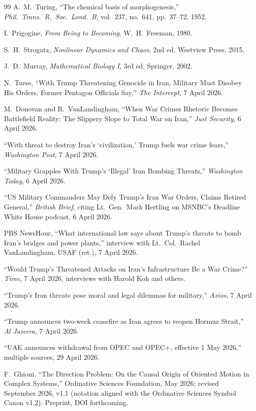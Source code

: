 \documentclass[12pt,a4paper]{article}
\begin{document}
\begin{thebibliography}{99}
A.~M.~Turing, ``The chemical basis of morphogenesis,'' \textit{Phil.~Trans.~R.~Soc.~Lond.~B}, vol.~237, no.~641, pp.~37--72, 1952.

I.~Prigogine, \textit{From Being to Becoming}. W.~H.~Freeman, 1980.

S.~H.~Strogatz, \textit{Nonlinear Dynamics and Chaos}, 2nd ed. Westview Press, 2015.

J.~D.~Murray, \textit{Mathematical Biology I}, 3rd ed. Springer, 2002.

N.~Turse, ``With Trump Threatening Genocide in Iran, Military Must Disobey His Orders, Former Pentagon Officials Say,'' \textit{The Intercept}, 7 April 2026.

M.~Donovan and R.~VanLandingham, ``When War Crimes Rhetoric Becomes Battlefield Reality: The Slippery Slope to Total War on Iran,'' \textit{Just Security}, 6 April 2026.

``With threat to destroy Iran's `civilization,' Trump fuels war crime fears,'' \textit{Washington Post}, 7 April 2026.

``Military Grapples With Trump's `Illegal' Iran Bombing Threats,'' \textit{Washington Today}, 6 April 2026.

``US Military Commanders May Defy Trump's Iran War Orders, Claims Retired General,'' \textit{British Brief}, citing Lt.~Gen.~Mark Hertling on MSNBC's Deadline White House podcast, 6 April 2026.

PBS NewsHour, ``What international law says about Trump's threats to bomb Iran's bridges and power plants,'' interview with Lt.~Col.~Rachel VanLandingham, USAF (ret.), 7 April 2026.

``Would Trump's Threatened Attacks on Iran's Infrastructure Be a War Crime?'' \textit{Time}, 7 April 2026, interviews with Harold Koh and others.

``Trump's Iran threats pose moral and legal dilemmas for military,'' \textit{Axios}, 7 April 2026.

``Trump announces two-week ceasefire as Iran agrees to reopen Hormuz Strait,'' \textit{Al Jazeera}, 7 April 2026.

``UAE announces withdrawal from OPEC and OPEC+, effective 1 May 2026,'' multiple sources, 29 April 2026.

F.~Ghioni, ``The Direction Problem: On the Causal Origin of Oriented Motion in Complex Systems,'' Ordinative Sciences Foundation, May 2026; revised September 2026, v1.1 (notation aligned with the Ordinative Sciences Symbol Canon v1.2). Preprint, DOI forthcoming.

\end{thebibliography}
\end{document}
